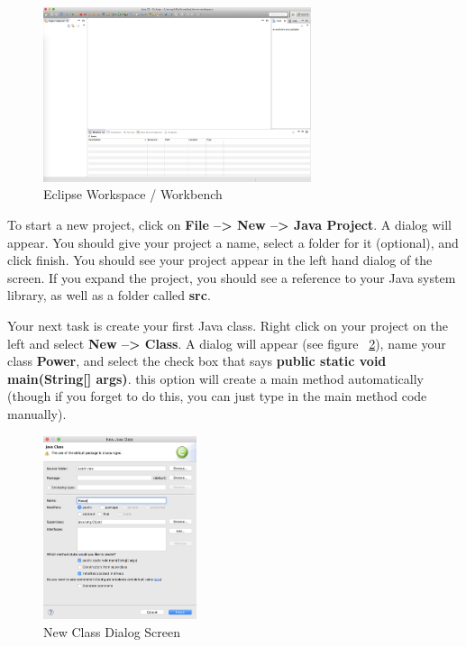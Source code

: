 \documentclass[paper=a4, fontsize=11pt, parskip=full]{scrartcl} %
\numberwithin{equation}{section} %
\numberwithin{figure}{section} %
\numberwithin{table}{section} %
\begin{document}
\begin{figure}[H]
\centering
\includegraphics[width=0.7\textwidth]{images/eclipse_workspace.png}
\caption{Eclipse Workspace / Workbench}
\label{fig:workspace}
\end{figure}

To start a new project, click on \textbf{File --> New --> Java Project}. A dialog will appear. You should give your project a name, select a folder for it (optional), and click finish. You should see your project appear in the left hand dialog of the screen. If you expand the project, you should see a reference to your Java system library, as well as a folder called \textbf{src}. 

Your next task is create your first Java class. Right click on your project on the left and select \textbf{New --> Class}. A dialog will appear (see figure ~\ref{fig:newclass}), name your class \textbf{Power}, and select the check box that says \textbf{public static void main(String[] args)}. this option will create a main method automatically (though if you forget to do this, you can just type in the main method code manually).

\begin{figure}[H]
\centering
\includegraphics[width=0.4\textwidth]{images/eclipse_class_dialog.png}
\caption{New Class Dialog Screen}
\label{fig:newclass}
\end{figure}
\end{document}
